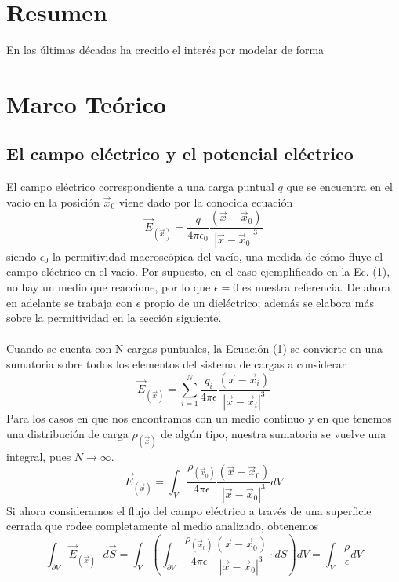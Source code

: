 \documentclass[12pt, notitlepage]{article}
\begin{document}
\section{Resumen}
En las últimas décadas ha crecido el interés por modelar de forma 
\pagebreak
\section{Marco Teórico}
\subsection{El campo eléctrico y el potencial eléctrico}
El campo eléctrico correspondiente a una carga puntual $q$ que se encuentra en el vacío en la posición $\vec{x}_0$ viene dado por la conocida ecuación
\begin{equation}
\vec{E}_{(\vec{x})} = \frac{q}{4\pi\epsilon_0}\frac{(\vec{x} - \vec{x}_0)}{|\vec{x}-\vec{x}_0|^3}
\end{equation}
siendo $\epsilon_0$ la permitividad macroscópica del vacío, una medida de cómo fluye el campo eléctrico en el vacío. Por supuesto, en el caso ejemplificado en la Ec. (1), no hay un medio que reaccione, por lo que $\epsilon=0$ es nuestra referencia. De ahora en adelante se trabaja con $\epsilon$ propio de un dieléctrico; además se elabora más sobre la permitividad en la sección siguiente.\\\\
Cuando se cuenta con N cargas puntuales, la Ecuación (1) se convierte en una sumatoria sobre todos los elementos del sistema de cargas a considerar
\begin{equation}
\vec{E}_{(\vec{x})} = \sum_{i=1}^N\frac{q_i}{4\pi\epsilon}\frac{(\vec{x} - \vec{x}_i)}{|\vec{x}-\vec{x}_i|^3}
\end{equation}
Para los casos en que nos encontramos con un medio  continuo y en que tenemos una distribución de carga $\rho_{(\vec{x})}$ de algún tipo, nuestra sumatoria se vuelve una integral, pues $N\rightarrow \infty$.
\begin{equation}
\vec{E}_{(\vec{x})} = \int_V\frac{\rho_{(\vec{x}_0)}}{4\pi\epsilon}\frac{(\vec{x} - \vec{x}_0)}{|\vec{x}-\vec{x}_0|^3} dV
\end{equation}
Si ahora consideramos el flujo del campo eléctrico a través de una superficie cerrada que rodee completamente al medio analizado, obtenemos
\begin{equation}
\int_{\partial V}\vec{E}_{(\vec{x})}\cdot d\vec{S} = \int_V\left(\int_{\partial V}\frac{\rho_{(\vec{x}_0)}}{4\pi\epsilon}\frac{(\vec{x} - \vec{x}_0)}{|\vec{x}-\vec{x}_0|^3}\cdot dS\right)dV = \int_V \frac{\rho}{\epsilon} dV
\end{equation}
\end{document}
